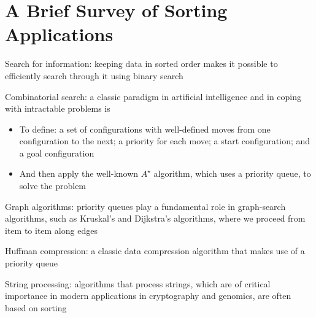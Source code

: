 \documentclass[8pt,a4paper,compress]{beamer}
\begin{document}
\section{A Brief Survey of Sorting Applications}
\begin{frame}[fragile]
\pause

Search for information: keeping data in sorted order makes it possible to efficiently search through it using binary search

\pause
\bigskip

Combinatorial search: a classic paradigm in artificial intelligence and in coping with intractable problems is
\begin{itemize}
\item To define: a set of configurations with well-defined moves from one configuration to the next; a priority for each move; a start configuration; and a goal configuration  

\item And then apply the well-known $A^\star$ algorithm, which uses a priority queue, to solve the problem
\end{itemize}

\pause
\bigskip

Graph algorithms: priority queues play a fundamental role in graph-search algorithms, such as Kruskal's and Dijkstra's algorithms, where we proceed from item to item along edges

\pause
\bigskip

Huffman compression: a classic data compression algorithm that makes use of a priority queue

\pause
\bigskip

String processing: algorithms that process strings, which are of critical importance in modern applications in cryptography and genomics, are often based on sorting
\end{frame}
\end{document}
